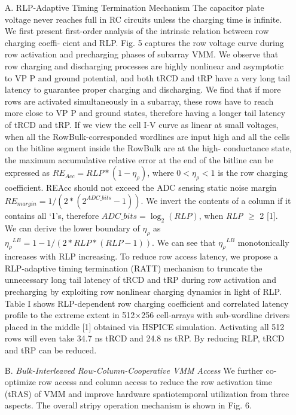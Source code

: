 \documentclass{article}
\begin{document}
 		\begin{itemize}
 			\item[A.] RLP-Adaptive Timing Termination Mechanism
 				The capacitor plate voltage never reaches full in RC circuits
 				unless the charging time is infinite. We first present first-order
 				analysis of the intrinsic relation between row charging coeffi-
 				cient and RLP. Fig. 5 captures the row voltage curve during
 				row activation and precharging phases of subarray VMM. We
 				observe that row charging and discharging processes are highly
 				nonlinear and asymptotic to VP P and ground potential, and
 				both tRCD and tRP have a very long tail latency to guarantee
 				proper charging and discharging. We find that if more rows
 				are activated simultaneously in a subarray, these rows have
 				to reach more close to VP P and ground states, therefore
 				having a longer tail latency of tRCD and tRP. If we view
 				the cell I-V curve as linear at small voltages, when all the
 				RowBulk-corresponded wordlines are input high and all the
 				cells on the bitline segment inside the RowBulk are at the high-
 				conductance state, the maximum accumulative relative error at
 				the end of the bitline can be expressed as $RE_{Acc} = RLP * (1 - \eta_{\rho})$, where $0 < \eta_{\rho} < 1$ is the row charging coefficient.
 				REAcc should not exceed the ADC sensing static noise margin
 				$RE_{margin} = 1/(2*(2^{ADC{\_}{bits}} - 1))$. We invert the contents
 				of a column if it contains all ‘1’s, therefore ${ADC}\_{bits} = \log_2 (RLP)$, when \textit{RLP} $\geq$ 2 [1]. We can derive the lower
 				boundary of $\eta_{\rho}$ as ${\eta_{\rho}}^{LB} = 1 - 1/(2*{RLP}*({RLP} - 1))$. We can
 				see that ${\eta_{\rho}}^{LB}$ monotonically increases with RLP increasing. To
 				reduce row access latency, we propose a RLP-adaptive timing
 				termination (RATT) mechanism to truncate the unnecessary
 				long tail latency of tRCD and tRP during row activation and
 				precharging by exploiting row nonlinear charging dynamics
 				in light of RLP. Table I shows RLP-dependent row charging
 				coefficient and correlated latency profile to the extreme extent
 				in 512×256 cell-arrays with sub-wordline drivers placed in
 				the middle [1] obtained via HSPICE simulation. Activating
 				all 512 rows will even take 34.7 ns tRCD and 24.8 ns tRP. By
 				reducing RLP, tRCD and tRP can be reduced.
 			\item[B.] \textit{Bulk-Interleaved Row-Column-Cooperative VMM Access}
 				We further co-optimize row access and column access to
 				reduce the row activation time (tRAS) of VMM and improve
 				hardware spatiotemporal utilization from three aspects. The
 				overall stripy operation mechanism is shown in Fig. 6.
 				

\end{itemize}
\end{document}
